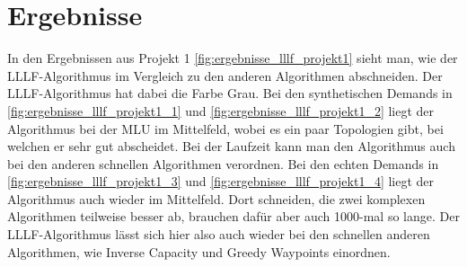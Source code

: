 \section{Ergebnisse}

    In den Ergebnissen aus Projekt 1 \ref{fig:ergebnisse_lllf_projekt1} sieht man, wie der LLLF-Algorithmus im Vergleich zu den anderen Algorithmen abschneiden. Der LLLF-Algorithmus hat dabei die Farbe Grau. Bei den synthetischen Demands in \ref{fig:ergebnisse_lllf_projekt1_1} und \ref{fig:ergebnisse_lllf_projekt1_2} liegt der Algorithmus bei der MLU im Mittelfeld, wobei es ein paar Topologien gibt, bei welchen er sehr gut abscheidet. Bei der Laufzeit kann man den Algorithmus auch bei den anderen schnellen Algorithmen verordnen. 
    Bei den echten Demands in \ref{fig:ergebnisse_lllf_projekt1_3} und \ref{fig:ergebnisse_lllf_projekt1_4} liegt der Algorithmus auch wieder im Mittelfeld. Dort schneiden, die zwei komplexen Algorithmen teilweise besser ab, brauchen dafür aber auch 1000-mal so lange. Der LLLF-Algorithmus lässt sich hier also auch wieder bei den schnellen anderen Algorithmen, wie Inverse Capacity und Greedy Waypoints einordnen. 
